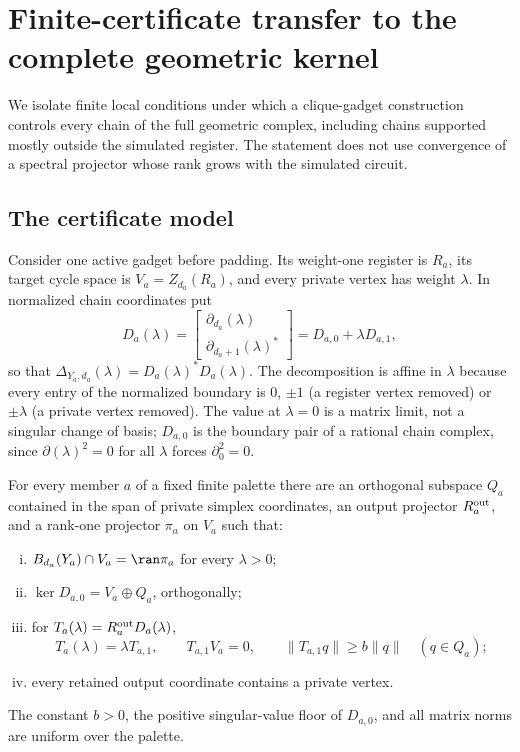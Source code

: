 \section{Finite-certificate transfer to the complete geometric kernel}
\label{sec:transfer}

We isolate finite local conditions under which a clique-gadget construction
controls every chain of the full geometric complex, including chains
supported mostly outside the simulated register.  The statement does not use
convergence of a spectral projector whose rank grows with the simulated
circuit.

\subsection{The certificate model}

Consider one active gadget before padding.  Its weight-one register is \(R_a\),
its target cycle space is \(V_a=Z_{d_a}(R_a)\), and every private vertex has
weight \(\lambda\).  In normalized chain coordinates put
\[
D_a(\lambda)=
\begin{bmatrix}\partial_{d_a}(\lambda)\\
\partial_{d_a+1}(\lambda)^*\end{bmatrix}
=D_{a,0}+\lambda D_{a,1},
\]
so that \(\Delta_{Y_a,d_a}(\lambda)=D_a(\lambda)^*D_a(\lambda)\).  The
decomposition is affine in \(\lambda\) because every entry of the normalized
boundary is \(0\), \(\pm1\) (a register vertex removed) or \(\pm\lambda\) (a
private vertex removed).  The value at \(\lambda=0\) is a matrix limit, not
a singular change of basis; \(D_{a,0}\) is the boundary pair of a rational
chain complex, since \(\partial(\lambda)^2=0\) for all \(\lambda\) forces
\(\partial_0^2=0\).

\begin{assumption}
\label{ass:local-certificate}
For every member \(a\) of a fixed finite palette there are an orthogonal
subspace \(Q_a\) contained in the span of private simplex coordinates, an
output projector \(R_a^{\rm out}\), and a rank-one
projector \(\pi_a\) on \(V_a\) such that:
\begin{enumerate}[(i)]
\item \(B_{d_a}(Y_a)\cap V_a=\ran\pi_a\) for every \(\lambda>0\);
\item \(\ker D_{a,0}=V_a\oplus Q_a\), orthogonally;
\item for \(T_a(\lambda)=R_a^{\rm out}D_a(\lambda)\),
\[
T_a(\lambda)=\lambda T_{a,1},\qquad T_{a,1}V_a=0,\qquad
\|T_{a,1}q\|\ge b\|q\|\quad(q\in Q_a);
\]
\item every retained output coordinate contains a private vertex.
\end{enumerate}
The constant \(b>0\), the positive singular-value floor of \(D_{a,0}\), and
all matrix norms are uniform over the palette.
\end{assumption}

